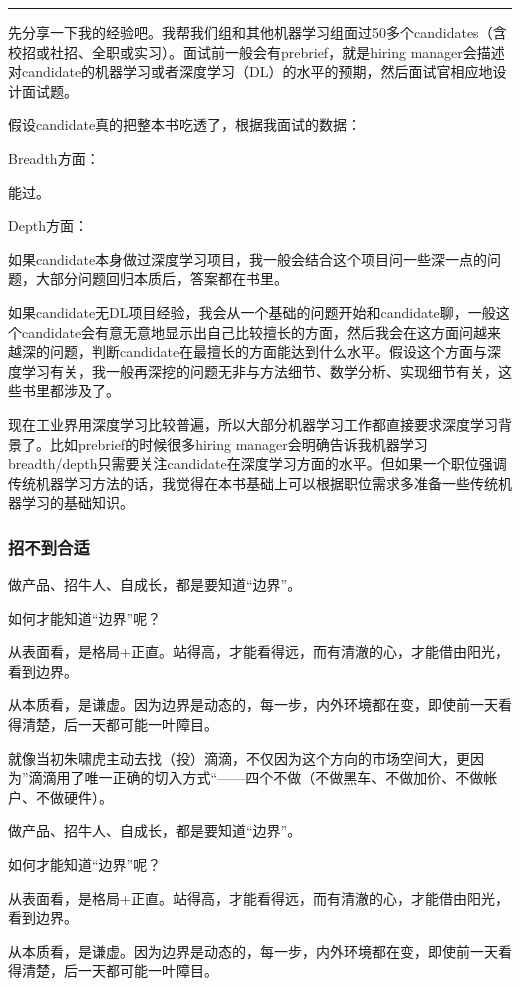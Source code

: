 \documentclass[letterpaper,11pt,english]{sphinxmanual}
\begin{document}
\bigskip\hrule\bigskip


先分享一下我的经验吧。我帮我们组和其他机器学习组面过50多个candidates（含校招或社招、全职或实习）。面试前一般会有prebrief，就是hiring
manager会描述对candidate的机器学习或者深度学习（DL）的水平的预期，然后面试官相应地设计面试题。

假设candidate真的把整本书吃透了，根据我面试的数据：

Breadth方面：

能过。

Depth方面：

如果candidate本身做过深度学习项目，我一般会结合这个项目问一些深一点的问题，大部分问题回归本质后，答案都在书里。

如果candidate无DL项目经验，我会从一个基础的问题开始和candidate聊，一般这个candidate会有意无意地显示出自己比较擅长的方面，然后我会在这方面问越来越深的问题，判断candidate在最擅长的方面能达到什么水平。假设这个方面与深度学习有关，我一般再深挖的问题无非与方法细节、数学分析、实现细节有关，这些书里都涉及了。

现在工业界用深度学习比较普遍，所以大部分机器学习工作都直接要求深度学习背景了。比如prebrief的时候很多hiring
manager会明确告诉我机器学习breadth/depth只需要关注candidate在深度学习方面的水平。但如果一个职位强调传统机器学习方法的话，我觉得在本书基础上可以根据职位需求多准备一些传统机器学习的基础知识。


\subsubsection{招不到合适}
\label{\detokenize{chapter_interview/hire:id1}}\label{\detokenize{chapter_interview/hire::doc}}
做产品、招牛人、自成长，都是要知道“边界”。

如何才能知道“边界”呢？

从表面看，是格局+正直。站得高，才能看得远，而有清澈的心，才能借由阳光，看到边界。

从本质看，是谦虚。因为边界是动态的，每一步，内外环境都在变，即使前一天看得清楚，后一天都可能一叶障目。

就像当初朱啸虎主动去找（投）滴滴，不仅因为这个方向的市场空间大，更因为”滴滴用了唯一正确的切入方式“——四个不做（不做黑车、不做加价、不做帐户、不做硬件）。

做产品、招牛人、自成长，都是要知道“边界”。

如何才能知道“边界”呢？

从表面看，是格局+正直。站得高，才能看得远，而有清澈的心，才能借由阳光，看到边界。

从本质看，是谦虚。因为边界是动态的，每一步，内外环境都在变，即使前一天看得清楚，后一天都可能一叶障目。
\end{document}

